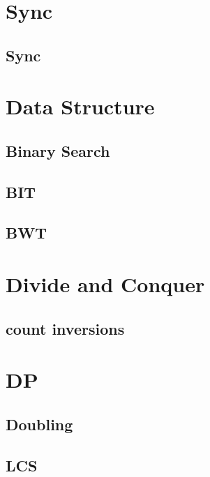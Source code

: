 \section{Sync}
        \subsection{Sync}
                

\section{Data Structure}
        \subsection{Binary Search}
                
        \subsection{BIT}
                
        \subsection{BWT}
                

\section{Divide and Conquer}
        \subsection{count inversions}
                

\section{DP} 
        \subsection{Doubling}
                
        \subsection{LCS}
                
